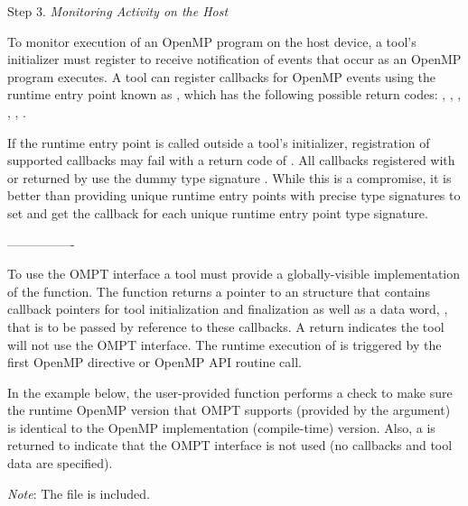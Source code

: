 Step 3. \emph{Monitoring Activity on the Host}
\begin{adjustwidth}{2.5em}{0pt}
To monitor execution of an OpenMP program on the host device, a tool's initializer
must register to receive notification of events that occur as an OpenMP program executes.
A tool can register callbacks for OpenMP events using the runtime entry point known
as , which has the following possible return codes: \hfill \break
 ,
 ,
 ,
 ,
 ,
 .

If the  runtime entry point is called outside a tool's initializer,
registration of supported callbacks may fail with a return code of .
All callbacks registered with  or returned by 
use the dummy type signature . While this is a compromise, it is
better than providing unique runtime entry points with precise type signatures
to set and get the callback for each unique runtime entry point type signature.
\end{adjustwidth}

----------------

To use the OMPT interface a tool must provide a globally-visible implementation
of the  function.
The function returns a pointer to an  structure 
that contains callback pointers for tool initialization and finalization as well 
as a data word, , that is to be passed by reference to these callbacks.
A  return indicates the tool will not use the OMPT interface.
The runtime execution of  is triggered by the first OpenMP 
directive or OpenMP API routine call.


In the example below, the user-provided  function
performs a check to make sure the runtime OpenMP version that OMPT supports 
(provided by the  argument) is identical to the 
OpenMP implementation (compile-time) version.
Also, a  is returned to indicate that the OMPT interface is not
used (no callbacks and tool data are specified). 

\emph{Note}: The  file is included.

